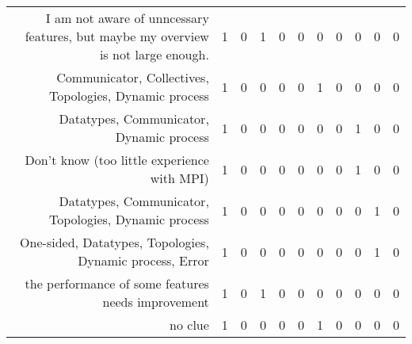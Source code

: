 {\begin{landscape}
\begin{longtable}[htb]{r|c|c|c|c|c|c|c|c|c|c}
{I am not aware of unncessary features, but maybe my overview is not large enough.} & 1 & 0 & 1 & 0 & 0 & 0 & 0 & 0 & 0 & 0 \\%
{Communicator, Collectives, Topologies, Dynamic process} & 1 & 0 & 0 & 0 & 0 & 1 & 0 & 0 & 0 & 0 \\%
{Datatypes, Communicator, Dynamic process} & 1 & 0 & 0 & 0 & 0 & 0 & 0 & 1 & 0 & 0 \\%
{Don't know (too little experience with MPI)} & 1 & 0 & 0 & 0 & 0 & 0 & 0 & 1 & 0 & 0 \\%
{Datatypes, Communicator, Topologies, Dynamic process} & 1 & 0 & 0 & 0 & 0 & 0 & 0 & 0 & 1 & 0 \\%
{One-sided, Datatypes, Topologies, Dynamic process, Error} & 1 & 0 & 0 & 0 & 0 & 0 & 0 & 0 & 1 & 0 \\%
{the performance of some features needs improvement} & 1 & 0 & 1 & 0 & 0 & 0 & 0 & 0 & 0 & 0 \\%
{no clue} & 1 & 0 & 0 & 0 & 0 & 1 & 0 & 0 & 0 & 0 \\%
\hline%
\end{longtable}%
\end{landscape}}%
\clearpage%
